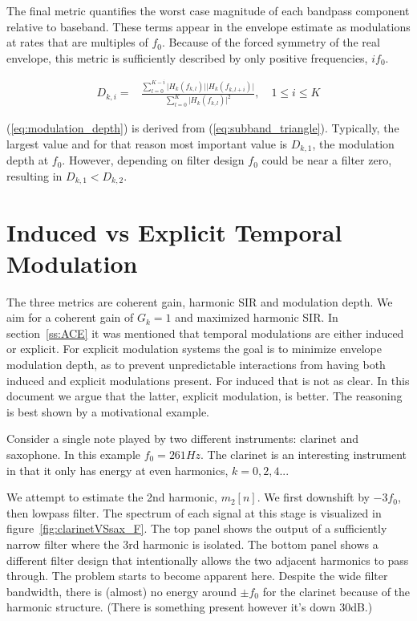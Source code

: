 \documentclass [11pt, proquest,oneside] {ganter_thesis}[2015/03/03]
\begin{document}
The final metric quantifies the worst case magnitude of each bandpass component relative to baseband.  These terms appear in the envelope estimate as modulations at rates that are multiples of $f_0$.  Because of the forced symmetry of the real envelope, this metric is sufficiently described by only positive frequencies, $if_0$.

\begin{align}
\label{eq:modulation_depth}
D_{k,i} =& \frac{\sum\limits_{l=0}^{K-i} \Big|H_k(f_{k,l})\Big| \Big|H_k(f_{k,l+i})\Big|}
{\sum\limits_{l=0}^K \Big|H_k(f_{k,l})\Big|^2}, \quad 1 \leq i \leq K
\end{align}

(\ref{eq:modulation_depth}) is derived from (\ref{eq:subband_triangle}).  Typically, the largest value and for that reason most important value is $D_{k,1}$, the modulation depth at $f_0$.  However, depending on filter design $f_0$ could be near a filter zero, resulting in $D_{k,1} < D_{k,2}$.

\section{Induced vs Explicit Temporal Modulation}\label{section:inducedVexplicit}

The three metrics are coherent gain, harmonic SIR and modulation depth.  We aim for a coherent gain of $G_k = 1$ and maximized harmonic SIR.  In section~\ref{ss:ACE} it was mentioned that temporal modulations are either induced or explicit.  For explicit modulation systems the goal is to minimize envelope modulation depth, as to prevent unpredictable interactions from having both induced and explicit modulations present.  For induced that is not as clear.  In this document we argue that the latter, explicit modulation, is better.  The reasoning is best shown by a motivational example.

Consider a single note played by two different instruments: clarinet and saxophone.  In this example $f_0 = 261Hz$.  The clarinet is an interesting instrument in that it only has energy at even harmonics, $k = 0, 2, 4...$

We attempt to estimate the 2nd harmonic, $m_2[n]$.  We first downshift by $-3f_0$, then lowpass filter.  The spectrum of each signal at this stage is visualized in figure~\ref{fig:clarinetVSsax_F}.  The top panel shows the output of a sufficiently narrow filter where the 3rd harmonic is isolated.  The bottom panel shows a different filter design that intentionally allows the two adjacent harmonics to pass through.  The problem starts to become apparent here.  Despite the wide filter bandwidth, there is (almost) no energy around $\pm f_0$ for the clarinet because of the harmonic structure.  (There is something present however it's down 30dB.)
\end{document}
